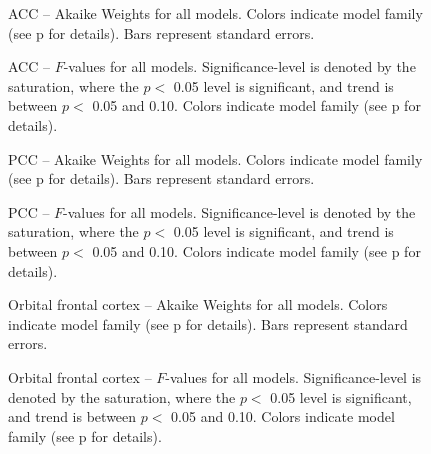 \documentclass[doc,12pt]{apa}        %
\begin{document}
\begin{figure}[tp]
    \centering
    \caption{ACC -- Akaike Weights for all models.  Colors indicate model family (see p\pageref{sub:cmb} for details). Bars represent standard errors.}
	\label{fig:ant}
\end{figure}
\begin{figure}[tp]
    \centering
    \caption{ACC -- $F$-values for all models.
    Significance-level is denoted by the saturation, where the $p <$ 0.05 level is
    significant, and trend is between $p <$ 0.05 and 0.10.  Colors indicate model family (see p\pageref{sub:cmb} for details).}
	\label{fig:fvalant}
\end{figure}


\begin{figure}[tp]
    \centering
    \caption{PCC -- Akaike Weights for all models.  Colors indicate model family (see p\pageref{sub:cmb} for details). Bars represent standard errors.}
	\label{fig:post}
\end{figure}
\begin{figure}[tp]
    \centering
    \caption{PCC -- $F$-values for all models.
    Significance-level is denoted by the saturation, where the $p <$ 0.05 level is
    significant, and trend is between $p <$ 0.05 and 0.10.  Colors indicate model family (see p\pageref{sub:cmb} for details).}
	\label{fig:fvalpost}
\end{figure}

\begin{figure}[tp]
    \centering
    \caption{Orbital frontal cortex -- Akaike Weights for all models.  Colors indicate model family (see p\pageref{sub:cmb} for details). Bars represent standard errors.}
	\label{fig:ofc}
\end{figure}
\begin{figure}[tp]
    \centering
    \caption{Orbital frontal cortex -- $F$-values for all models.
    Significance-level is denoted by the saturation, where the $p <$ 0.05 level is
    significant, and trend is between $p <$ 0.05 and 0.10.  Colors indicate model family (see p\pageref{sub:cmb} for details).}
	\label{fig:fvalofc}
\end{figure}
\end{document}
